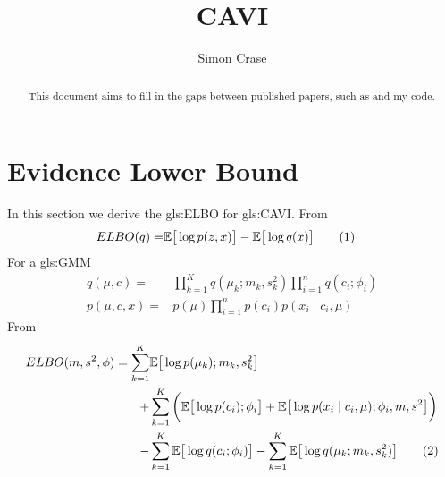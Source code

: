 \documentclass[]{article}
\title{CAVI}
\author{Simon Crase}
\newcommand{\Expectation}{\mathbb{E}}
\newcommand\numberthis{\addtocounter{equation}{1}\tag{\theequation}}
\begin{document}
\maketitle

\begin{abstract}
This document aims to fill in the gaps between published papers, such as \cite{blei2017variational} and my code.
\end{abstract}



\tableofcontents
\section{Evidence Lower Bound}

In this section we derive the \gls{gls:ELBO} for \gls{gls:CAVI}.
From \cite[(13)]{blei2017variational}
\begin{align*}
	ELBO(q) =& \Expectation\big[\log{p(z,x)}\big] - \Expectation\big[\log{q(x)}\big]  \numberthis \label{eq:ELBO}
\end{align*}
For a \gls{gls:GMM}
\begin{align*}
	q(\mu,c) =& \prod_{k=1}^{K} q(\mu_k;m_k,s_k^2) \prod_{i=1}^{n}q(c_i;\phi_i)\\
	p(\mu,c,x) =& p(\mu) \prod_{i=1}^{n} p(c_i) p(x_i \mid c_i,\mu)
\end{align*}
From \cite[(21)]{blei2017variational}
\begin{align*}
	ELBO(m,s^2,\phi) = \sum_{k=1}^{K}& \Expectation \big[ \log {p(\mu_k);m_k,s_k^2}\big]\\
	+& \sum_{k=1}^{K}\bigg(\Expectation\big[\log{p(c_i);\phi_i}\big] + \Expectation\big[\log{p(x_i\mid c_i,\mu);\phi_i,m,s^2}\big]\bigg)\\
	-& \sum_{k=1}^K\Expectation\big[\log{q(c_i;\phi_i)}\big] - \sum_{k=1}^K\Expectation \big[\log{q(\mu_k;m_k,s^2_k)}\big] \numberthis \label{eq:ELBO_GMM}
\end{align*}

\printglossaries




\end{document}
